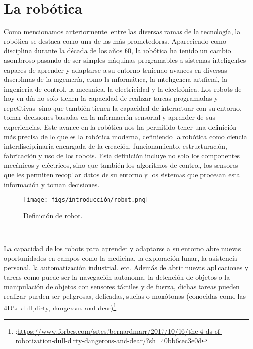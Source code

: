 \section{La robótica}
\label{sec:enfoquesrobotica}
Como mencionamos anteriormente, entre las diversas ramas de la tecnología, la robótica se destaca como una de las más prometedoras. Apareciendo como disciplina durante la década de los años 60, 
la robótica ha tenido un cambio asombroso  pasando de ser simples máquinas programables a sistemas inteligentes capaces de aprender y adaptarse 
a su entorno teniendo avances en diversas disciplinas de la ingeniería, como la informática, la inteligencia artificial, la ingeniería de control, la mecánica, 
la electricidad y la electrónica. 
Los robots de hoy en día no solo tienen la capacidad de realizar tareas programadas y repetitivas, sino que también tienen la capacidad de interactuar con su entorno, 
tomar decisiones basadas en la información sensorial y aprender de sus experiencias. Este avance en la robótica nos ha permitido tener una definición más precisa de lo que es 
la robótica moderna, definiendo la robótica como ciencia interdisciplinaria encargada de la creación, funcionamiento, estructuración, fabricación y uso de los robots. 
Esta definición incluye no solo los componentes mecánicos y eléctricos, sino que también los algoritmos de control, los sensores que les permiten recopilar
datos de su entorno y los sistemas que procesan esta información y toman decisiones.

\begin{figure} [H]
  \begin{center}
    \texttt{[image: figs/introducción/robot.png]}
  \end{center}
  \caption{Definición de robot.}
  \label{fig:robot}
\end{figure}\

La capacidad de los robots para aprender y adaptarse a su entorno abre nuevas oportunidades en campos como la medicina, la exploración lunar, la asistencia personal, la automatización industrial, etc. 
Además de abrir nuevas aplicaciones y tareas como puede ser la navegación autónoma, la detención de objetos o 
la manipulación de objetos con sensores táctiles y de fuerza, dichas tareas pueden realizar pueden ser peligrosas, delicadas, sucias o monótonas 
(conocidas como las 4D's: dull,dirty, dangerous and dear)\footnote{:\url{https://www.forbes.com/sites/bernardmarr/2017/10/16/the-4-ds-of-robotization-dull-dirty-dangerous-and-dear/?sh=40bb6cec3e0d}}


